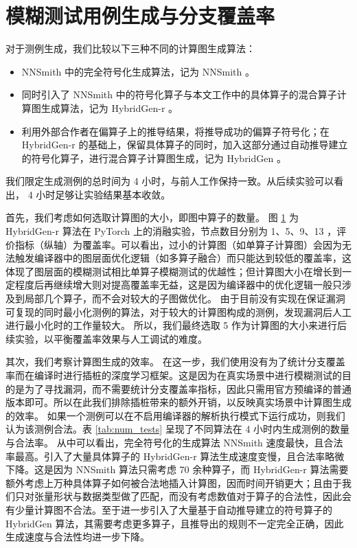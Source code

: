 \section{模糊测试用例生成与分支覆盖率}

对于测例生成，我们比较以下三种不同的计算图生成算法：
\begin{itemize}
    \item NNSmith 中的完全符号化生成算法，记为 NNSmith 。
    \item 同时引入了 NNSmith 中的符号化算子与本文工作中的具体算子的混合算子计算图生成算法，记为 HybridGen-r 。
    \item 利用外部合作者在偏算子上的推导结果，将推导成功的偏算子符号化；在 HybridGen-r 的基础上，保留具体算子的同时，加入这部分通过自动推导建立的符号化算子，进行混合算子计算图生成，记为 HybridGen 。
\end{itemize}
我们限定生成测例的总时间为 4 小时，与前人工作\cite{nnsmith,tzer}保持一致。从后续实验可以看出， 4 小时足够让实验结果基本收敛。

首先，我们考虑如何选取计算图的大小，即图中算子的数量。
图 \ref{} 为 HybridGen-r 算法在 PyTorch 上的消融实验，节点数目分别为 1、5、9、13 ，评价指标（纵轴）为覆盖率。可以看出，过小的计算图（如单算子计算图）会因为无法触发编译器中的图层面优化逻辑（如多算子融合）而只能达到较低的覆盖率，这体现了图层面的模糊测试相比单算子模糊测试的优越性；但计算图大小在增长到一定程度后再继续增大则对提高覆盖率无益，这是因为编译器中的优化逻辑一般只涉及到局部几个算子，而不会对较大的子图做优化。
由于目前没有实现在保证漏洞可复现的同时最小化测例的算法，对于较大的计算图构成的测例，发现漏洞后人工进行最小化时的工作量较大。
所以，我们最终选取 5 作为计算图的大小来进行后续实验，以平衡覆盖率效果与人工调试的难度。

其次，我们考察计算图生成的效率。
在这一步，我们使用没有为了统计分支覆盖率而在编译时进行插桩的深度学习框架。这是因为在真实场景中进行模糊测试的目的是为了寻找漏洞，而不需要统计分支覆盖率指标，因此只需用官方预编译的普通版本即可。所以在此我们排除插桩带来的额外开销，以反映真实场景中计算图生成的效率。
如果一个测例可以在不启用编译器的解析执行模式下运行成功，则我们认为该测例合法。表 \ref{tab:num_tests} 呈现了不同算法在 4 小时内生成测例的数量与合法率。
从中可以看出，完全符号化的生成算法 NNSmith 速度最快，且合法率最高。引入了大量具体算子的 HybridGen-r 算法生成速度变慢，且合法率略微下降。这是因为 NNSmith 算法只需考虑 70 余种算子，而 HybridGen-r 算法需要额外考虑上万种具体算子如何被合法地插入计算图，因而时间开销更大；且由于我们只对张量形状与数据类型做了匹配，而没有考虑数值对于算子的合法性，因此会有少量计算图不合法。至于进一步引入了大量基于自动推导建立的符号算子的 HybridGen 算法，其需要考虑更多算子，且推导出的规则不一定完全正确，因此生成速度与合法性均进一步下降。

